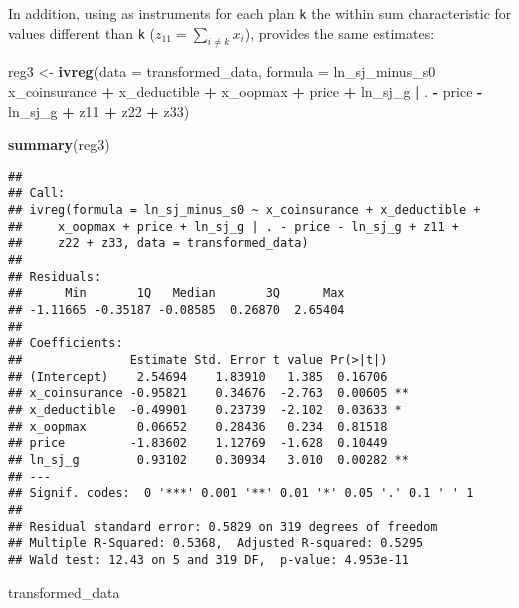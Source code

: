 \documentclass[]{article}
\newenvironment{Shaded}{\begin{snugshade}}{\end{snugshade}}
\newcommand{\DataTypeTok}[1]{\textcolor[rgb]{0.13,0.29,0.53}{#1}}
\newcommand{\KeywordTok}[1]{\textcolor[rgb]{0.13,0.29,0.53}{\textbf{#1}}}
\newcommand{\NormalTok}[1]{#1}
\newcommand{\OperatorTok}[1]{\textcolor[rgb]{0.81,0.36,0.00}{\textbf{#1}}}
\newcommand{\StringTok}[1]{\textcolor[rgb]{0.31,0.60,0.02}{#1}}
\begin{document}
In addition, using as instruments for each plan \texttt{k} the within
sum characteristic for values different than \texttt{k}
(\(z_{11} = \sum_{i \neq k } x_{i}\)), provides the same estimates:

\begin{Shaded}
\begin{Highlighting}[]
\NormalTok{reg3 <-}\StringTok{ }\KeywordTok{ivreg}\NormalTok{(}\DataTypeTok{data =}\NormalTok{ transformed_data, }
      \DataTypeTok{formula =}\NormalTok{ ln_sj_minus_s0 }\OperatorTok{~}\StringTok{ }\NormalTok{x_coinsurance }\OperatorTok{+}\StringTok{ }\NormalTok{x_deductible }\OperatorTok{+}\StringTok{ }\NormalTok{x_oopmax }\OperatorTok{+}\StringTok{ }\NormalTok{price }\OperatorTok{+}\StringTok{ }\NormalTok{ln_sj_g }\OperatorTok{|}\StringTok{ }\NormalTok{. }\OperatorTok{-}\StringTok{ }\NormalTok{price }\OperatorTok{-}\StringTok{ }\NormalTok{ln_sj_g }\OperatorTok{+}\StringTok{ }\NormalTok{z11 }\OperatorTok{+}\StringTok{ }\NormalTok{z22 }\OperatorTok{+}\StringTok{ }\NormalTok{z33)}

\KeywordTok{summary}\NormalTok{(reg3)}
\end{Highlighting}
\end{Shaded}

\begin{verbatim}
## 
## Call:
## ivreg(formula = ln_sj_minus_s0 ~ x_coinsurance + x_deductible + 
##     x_oopmax + price + ln_sj_g | . - price - ln_sj_g + z11 + 
##     z22 + z33, data = transformed_data)
## 
## Residuals:
##      Min       1Q   Median       3Q      Max 
## -1.11665 -0.35187 -0.08585  0.26870  2.65404 
## 
## Coefficients:
##               Estimate Std. Error t value Pr(>|t|)   
## (Intercept)    2.54694    1.83910   1.385  0.16706   
## x_coinsurance -0.95821    0.34676  -2.763  0.00605 **
## x_deductible  -0.49901    0.23739  -2.102  0.03633 * 
## x_oopmax       0.06652    0.28436   0.234  0.81518   
## price         -1.83602    1.12769  -1.628  0.10449   
## ln_sj_g        0.93102    0.30934   3.010  0.00282 **
## ---
## Signif. codes:  0 '***' 0.001 '**' 0.01 '*' 0.05 '.' 0.1 ' ' 1
## 
## Residual standard error: 0.5829 on 319 degrees of freedom
## Multiple R-Squared: 0.5368,  Adjusted R-squared: 0.5295 
## Wald test: 12.43 on 5 and 319 DF,  p-value: 4.953e-11
\end{verbatim}

\begin{Shaded}
\begin{Highlighting}[]
\NormalTok{transformed_data}
\end{Highlighting}
\end{Shaded}
\end{document}
